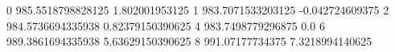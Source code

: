 0 985.5518798828125 1.802001953125
1 983.7071533203125 -0.042724609375
2 984.5736694335938 0.82379150390625
4 983.7498779296875 0.0
6 989.3861694335938 5.63629150390625
8 991.07177734375 7.3218994140625
